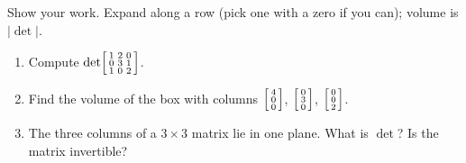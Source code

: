 \documentclass[10pt]{article}
\begin{document}
\begin{practicebox}
Show your work. Expand along a row (pick one with a zero if you can); volume is $|\det|$.
\begin{enumerate}[leftmargin=1.6em, itemsep=6pt]
  \item Compute $\det\begin{bsmallmatrix} 1 & 2 & 0 \\ 0 & 3 & 1 \\ 1 & 0 & 2 \end{bsmallmatrix}$. \writeline
  \item Find the volume of the box with columns $\begin{bsmallmatrix} 4\\0\\0 \end{bsmallmatrix}$, $\begin{bsmallmatrix} 0\\3\\0 \end{bsmallmatrix}$, $\begin{bsmallmatrix} 0\\0\\2 \end{bsmallmatrix}$. \writeline
  \item The three columns of a $3\times3$ matrix lie in one plane. What is $\det$? Is the matrix invertible? \writeline
\end{enumerate}
\end{practicebox}
\end{document}

